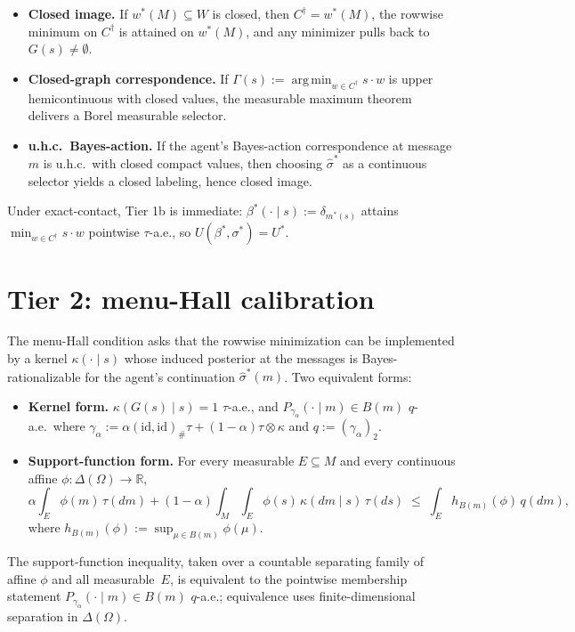 \documentclass[11pt]{article}
\theoremstyle{definition}
\theoremstyle{remark}
\newcommand{\R}{\mathbb{R}}
\newcommand{\Om}{\Omega}
\newcommand{\argmin}{\operatorname*{arg\,min}}
\begin{document}
\begin{itemize}[leftmargin=2em]
\item \textbf{Closed image.} If $w^*(M)\subseteq W$ is closed, then
$C^\dagger = w^*(M)$, the rowwise minimum on $C^\dagger$ is attained
on $w^*(M)$, and any minimizer pulls back to $G(s)\ne\emptyset$.
\item \textbf{Closed-graph correspondence.} If
$\Gamma(s) := \argmin_{w\in C^\dagger}s\cdot w$ is upper hemicontinuous
with closed values, the measurable maximum theorem
\cite[Thm.~18.19]{AliprantisBorder2006} delivers a Borel measurable
selector.
\item \textbf{u.h.c.\ Bayes-action.} If the agent's Bayes-action
correspondence at message $m$ is u.h.c.\ with closed compact values,
then choosing $\hat\sigma^*$ as a continuous selector yields a closed
labeling, hence closed image.
\end{itemize}

Under exact-contact, Tier 1b is immediate: $\beta^*(\cdot\mid s) := \delta_{m^*(s)}$
attains $\min_{w\in C^\dagger}s\cdot w$ pointwise $\tau$-a.e., so
$U(\beta^*,\sigma^*) = U^*$.

\section{Tier 2: menu-Hall calibration}\label{sec:tier2}

The menu-Hall condition asks that the rowwise minimization can be
implemented by a kernel $\kappa(\cdot\mid s)$ whose induced posterior
at the messages is Bayes-rationalizable for the agent's continuation
$\hat\sigma^*(m)$. Two equivalent forms:
\begin{itemize}[leftmargin=2em]
\item \textbf{Kernel form.} $\kappa(G(s)\mid s) = 1$ $\tau$-a.e., and
$P_{\gamma_\alpha}(\cdot\mid m)\in B(m)$ $q$-a.e.\ where
$\gamma_\alpha := \alpha(\mathrm{id},\mathrm{id})_\#\tau + (1-\alpha)\tau\otimes\kappa$
and $q := (\gamma_\alpha)_2$.
\item \textbf{Support-function form.} For every measurable $E\subseteq M$
and every continuous affine $\phi:\Delta(\Om)\to\R$,
\[
  \alpha\!\int_E\phi(m)\,\tau(dm) + (1-\alpha)\!\int_M\!\!\int_E\phi(s)\,\kappa(dm\mid s)\,\tau(ds) \;\le\; \int_E h_{B(m)}(\phi)\,q(dm),
\]
where $h_{B(m)}(\phi) := \sup_{\mu\in B(m)}\phi(\mu)$.
\end{itemize}
The support-function inequality, taken over a countable separating
family of affine $\phi$ and all measurable~$E$, is equivalent to the
pointwise membership statement $P_{\gamma_\alpha}(\cdot\mid m)\in B(m)$
$q$-a.e.; equivalence uses finite-dimensional separation in
$\Delta(\Om)$.
\end{document}
